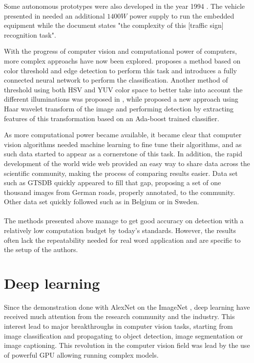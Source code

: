 Some autonomous prototypes were also developed in the year 1994 \cite{ulmer1994vita}. The vehicle presented in \cite{ulmer1994vita} needed an additional $1400W$ power supply to run the embedded equipment while the document states "the complexity of this [traffic sign] recognition task".

With the progress of computer vision and computational power of computers, more complex approachs have now been explored. \cite{de1997road} proposes a method based on color threshold and edge detection to perform this task and introduces a fully connected neural network to perform the classification. Another method of threshold using both HSV and YUV color space to better take into account the different illuminations was proposed in \cite{shadeed2003road}, while \cite{bahlmann2005system} proposed a new approach using Haar wavelet transform of the image and performing detection by extracting features of this transformation based on an Ada-boost trained classifier.

As more computational power became available, it became clear that computer vision algorithms needed machine learning to fine tune their algorithms, and as such data started to appear as a cornerstone of this task. In addition, the rapid development of the world wide web provided an easy way to share data across the scientific community, making the process of comparing results easier. Data set such as GTSDB \cite{gtsdb} quickly appeared to fill that gap, proposing a set of one thousand images from German roads, properly annotated, to the community. Other data set quickly followed such as \cite{mathias2013traffic} in Belgium or \cite{larssonSCIA2011} in Sweden.

\paragraph{}
The methods presented above manage to get good accuracy on detection with a relatively low computation budget by today's standards. However, the results often lack the repeatability needed for real word application and are specific to the setup of the authors.

\section{Deep learning}
\paragraph{}
Since the demonstration done with AlexNet \cite{alexnet} on the ImageNet \cite{deng2009imagenet}, deep learning have received much attention from the research community and the industry. This interest lead to major breakthroughs in computer vision tasks, starting from image classification and propagating to object detection, image segmentation or image captioning. This revolution in the computer vision field was lead by the use of powerful GPU allowing running complex models.
